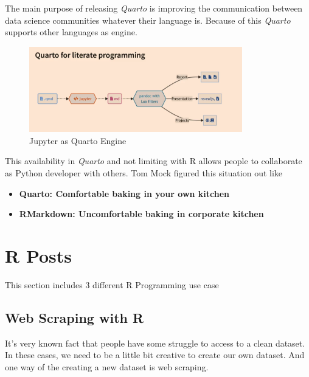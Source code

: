 \documentclass[
  letterpaper,
  DIV=11,
  numbers=noendperiod]{scrreprt}
\providecommand{\tightlist}{%
  \setlength{\itemsep}{0pt}\setlength{\parskip}{0pt}}\usepackage{longtable,booktabs,array}
\begin{document}
The main purpose of releasing \emph{Quarto} is improving the
communication between data science communities whatever their language
is. Because of this \emph{Quarto} supports other languages as engine.

\begin{figure}

{\centering 

\includegraphics[width=3.64583in,height=\textheight]{./images/quartojupytersupport.PNG}

}

\caption{\label{fig-quarto-language-support}Jupyter as Quarto Engine}

\end{figure}

This availability in \emph{Quarto} and not limiting with R allows people
to collaborate as Python developer with others. Tom Mock figured this
situation out like

\begin{itemize}
\tightlist
\item
  \textbf{Quarto: Comfortable baking in your own kitchen}
\item
  \textbf{RMarkdown: Uncomfortable baking in corporate kitchen}
\end{itemize}

\hypertarget{r-posts}{%
\section{R Posts}\label{r-posts}}

This section includes 3 different R Programming use case

\hypertarget{web-scraping-with-r}{%
\subsection{Web Scraping with R}\label{web-scraping-with-r}}

It's very known fact that people have some struggle to access to a clean
dataset. In these cases, we need to be a little bit creative to create
our own dataset. And one way of the creating a new dataset is web
scraping.
\end{document}
